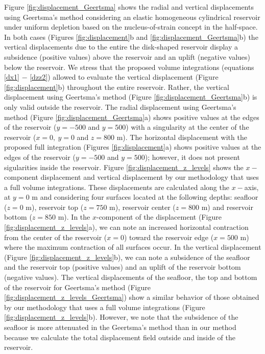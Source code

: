 \documentclass[P]{BrJG_submit}
\begin{document}
Figure \ref{fig:displacement_Geertsma} shows the radial and vertical displacements using Geertsma’s method considering an elastic homogeneous cylindrical reservoir under uniform depletion based on the nucleus-of-strain concept in the half-space.
In both cases (Figures \ref{fig:displacement}b and \ref{fig:displacement_Geertsma}b) the vertical displacements due to the entire the disk-shaped reservoir display a subsidence (positive values) above the reservoir and an uplift (negative values) below the reservoir.
We stress that the proposed volume integrations  (equations \ref{dx1} $-$ \ref{dzz2})  allowed  to evaluate the  vertical displacement (Figure \ref{fig:displacement}b) throughout  the entire reservoir.
Rather, the  vertical displacement using Geertsma’s method 
(Figure \ref{fig:displacement_Geertsma}b) is only valid outside the reservoir. 
The radial displacement using Geertsma’s method 
(Figure \ref{fig:displacement_Geertsma}a) shows positive values at the edges of the reservoir ($y= -500$ and $y = 500$) with a singularity at the center of the reservoir 
($x= 0, \: y = 0$ and $z = 800$ m). 
The horizontal displacement with the proposed full integration 
(Figures \ref{fig:displacement}a) shows positive values at the edges of the reservoir ($y= -500$ and $y = 500$); however, it does not present sigularities inside the reservoir.
Figure \ref{fig:displacement_z_levels} shows the $x-$component displacement and vertical displacement by our methodology that uses a full volume integrations.
These displacements are calculated along the $x-$axis, at $y = 0$ m and considering four surfaces located at the following depths:  seafloor ($z = 0$ m), reservoir top ($z = 750$ m), reservoir center ($z = 800$ m) and reservoir bottom ($z = 850$ m).
In the $x$-component of the displacement (Figure \ref{fig:displacement_z_levels}a), we can note an increased horizontal contraction from the center of the reservoir ($x = 0$) toward the reservoir edge ($x= 500$ m) where the maximum contraction of all surfaces occur.
In the vertical displacement (Figure \ref{fig:displacement_z_levels}b), we can note a subsidence of the seafloor and the reservoir top (positive values) and an uplift of the reservoir bottom (negative values).
The vertical displacements of the seafloor, the top and bottom of the reservoir for Geertsma’s method (Figure \ref{fig:displacement_z_levels_Geertsma}) show a similar behavior of those obtained by our methodology that uses a full volume integrations (Figure \ref{fig:displacement_z_levels}b). 
However, we note that the subsidence of the seafloor is more attenuated in the Geertsma’s method than in our method because we calculate the total displacement field outside and inside of the reservoir.
\end{document}
